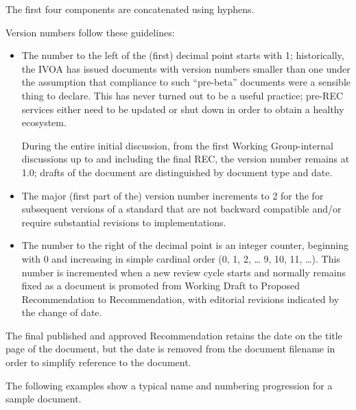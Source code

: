 \documentclass[11pt,a4paper]{ivoa}
\begin{document}
The first four components are concatenated using hyphens.

Version numbers follow these guidelines:

\begin{itemize}
\item The number to the left of the (first) decimal point starts with 1;
historically, the IVOA has issued documents with version numbers smaller
than one under the assumption that compliance to such ``pre-beta''
documents were a sensible thing to declare.  This has never turned out
to be a useful practice; pre-REC services either need to be updated or
shut down in order to obtain a healthy ecosystem.

During the entire initial discussion, from the first Working
Group-internal discussions up to and including the final REC, the
version number remains at 1.0; drafts of the document are distinguished
by document type and date.

\item The major (first part of the) version number increments to 2 for the
for subsequent versions of a standard that are
not backward compatible and/or require substantial revisions to
implementations.

\item The number to the right of the decimal point is an integer counter,
beginning with 0 and increasing in simple cardinal order (0, 1, 2, \dots
9, 10, 11, \dots).  This number is incremented when a new review cycle
starts and normally remains
fixed as a document is promoted from Working Draft to Proposed
Recommendation to Recommendation, with editorial revisions indicated by
the change of date.

\end{itemize}

The final published and approved Recommendation retains the date on the
title page of the document, but the date is removed from the document
filename in order to simplify reference to the document.

The following examples show a typical name and numbering progression for
a sample document.
\end{document}
